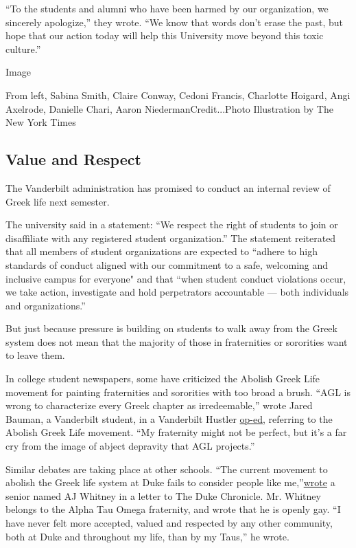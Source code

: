 ``To the students and alumni who have been harmed by our organization,
we sincerely apologize,'' they wrote. ``We know that words don't erase
the past, but hope that our action today will help this University move
beyond this toxic culture.''

Image

From left, Sabina Smith, Claire Conway, Cedoni Francis, Charlotte
Hoigard, Angi Axelrode, Danielle Chari, Aaron NiedermanCredit...Photo
Illustration by The New York Times

\hypertarget{value-and-respect}{%
\subsection{Value and Respect}\label{value-and-respect}}

The Vanderbilt administration has promised to conduct an internal review
of Greek life next semester.

The university said in a statement: ``We respect the right of students
to join or disaffiliate with any registered student organization.'' The
statement reiterated that all members of student organizations are
expected to ``adhere to high standards of conduct aligned with our
commitment to a safe, welcoming and inclusive campus for everyone" and
that ``when student conduct violations occur, we take action,
investigate and hold perpetrators accountable --- both individuals and
organizations.''

But just because pressure is building on students to walk away from the
Greek system does not mean that the majority of those in fraternities or
sororities want to leave them.

In college student newspapers, some have criticized the Abolish Greek
Life movement for painting fraternities and sororities with too broad a
brush. ``AGL is wrong to characterize every Greek chapter as
irredeemable,'' wrote Jared Bauman, a Vanderbilt student, in a
Vanderbilt Hustler
\href{https://vanderbilthustler.com/33363/featured/guest-editorial-how-abolish-greek-life-gets-it-wrong/}{op-ed},
referring to the Abolish Greek Life movement. ``My fraternity might not
be perfect, but it's a far cry from the image of abject depravity that
AGL projects.''

Similar debates are taking place at other schools. ``The current
movement to abolish the Greek life system at Duke fails to consider
people like
me,''\href{https://www.dukechronicle.com/article/2020/07/being-gay-in-greek-life-ato}{wrote}
a senior named AJ Whitney in a letter to The Duke Chronicle. Mr. Whitney
belongs to the Alpha Tau Omega fraternity, and wrote that he is openly
gay. ``I have never felt more accepted, valued and respected by any
other community, both at Duke and throughout my life, than by my Taus,''
he wrote.

